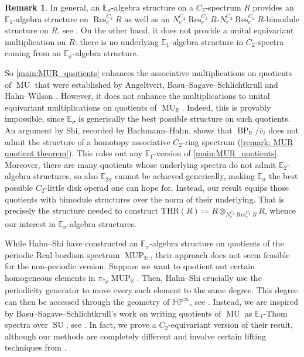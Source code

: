 \documentclass[a4paper, 10pt]{article}
\newcommand{\E}{\mathbb E}  %
\newcommand{\MU}{\operatorname{MU}}
\newcommand{\MUP}{\operatorname{MUP}}
\newcommand{\MUR}{{\MU_{\mathbb{R}}}}
\newcommand{\MUPR}{{\MUP_{\mathbb{R}}}}
\newcommand{\BP}{\operatorname{BP}}
\newcommand{\BPR}{{\BP_{\mathbb{R}}}}
\newcommand{\Res}{\operatorname{Res}}
\newcommand{\SU}{\operatorname{SU}}
\newcommand{\ol}{\overline}
\newcommand{\THR}{\mathrm{THR}}
\theoremstyle{definition}
\newtheorem{mainrem}[mainrem]{Remark}
\begin{document}
\begin{mainrem} \label{main: remark generic}
    In general, an $\E_{\sigma}$-algebra structure on a $C_2$-spectrum $R$ provides an $\E_1$-algebra structure on $\Res_e^{C_2} R$ as well as an $N_e^{C_2} \Res_e^{C_2} R$-$N_e^{C_2} \Res_e^{C_2}R$-bimodule structure on $R$, see \cite{horev2019genuineequivariantfactorizationhomology, Hill22disks}. On the other hand, it does not provide a unital equivariant multiplication on $R$: there is no underlying $\E_1$-algebra structure in $C_2$-spectra coming from an $\E_{\sigma}$-algebra structure.
    
    So \cref{main:MUR_quotients} enhances the associative multiplications on quotients of $\MU$ that were established by Angeltveit, Basu--Sagave--Schlichtkrull and Hahn--Wilson  \cite{Angeltveit_2008, Basu_2017, hahnWilson2022redshift}. However, it does not enhance the multiplications to unital equivariant multiplications on quotients of $\MUR$. Indeed, this is provably impossible, since $\E_{\sigma}$ is generically the best possible structure on such quotients. An argument by Shi, recorded by Bachmann--Hahn, shows that $\BPR/\ol{v}_i$ does not admit the structure of a homotopy associative $C_2$-ring spectrum (\cref{remark: MUR quotient theorem}). This rules out any $\E_1$-version of \cref{main:MUR_quotients}. Moreover, there are many quotients whose underlying spectra do not admit $\E_2$-algebra structures, so also $\E_{2\sigma}$ cannot be achieved generically, making $\E_{\sigma}$ the best possible $C_2$-little disk operad one can hope for. Instead, our result equips those quotients with bimodule structures over the norm of their underlying. That is precisely the structure needed to construct $\THR(R) \coloneqq R \otimes_{N_e^{C_2} \Res_e^{C_2} R} R$, whence our interest in $\E_{\sigma}$-algebra structures.
\end{mainrem}

While Hahn--Shi \cite{hahnRealOrientationsLubin2020} have constructed an $\E_{\sigma}$-algebra structure on quotients of the periodic Real bordism spectrum $\MUPR$, their approach does not seem feasible for the non-periodic version. Suppose we want to quotient out certain homogeneous elements in $\pi_{*\rho} \MUPR$. Then, Hahn--Shi crucially use the periodicity generator to move every such element to the same degree. This degree can then be accessed through the geometry of $\mathbb{HP}^{\infty}$, see \cite[Proposition 4.2]{hahnRealOrientationsLubin2020}. Instead, we are inspired by Basu--Sagave--Schlichtkrull's work on writing quotients of $\MU$ as $\E_1$-Thom spectra over $\SU$, see \cite{Basu_2017}. In fact, we prove a $C_2$-equivariant version of their result, although our methods are completely different and involve certain lifting techniques from \cite{quinnZhu2026multiplicativeequivariantthomspectra}.
\end{document}
